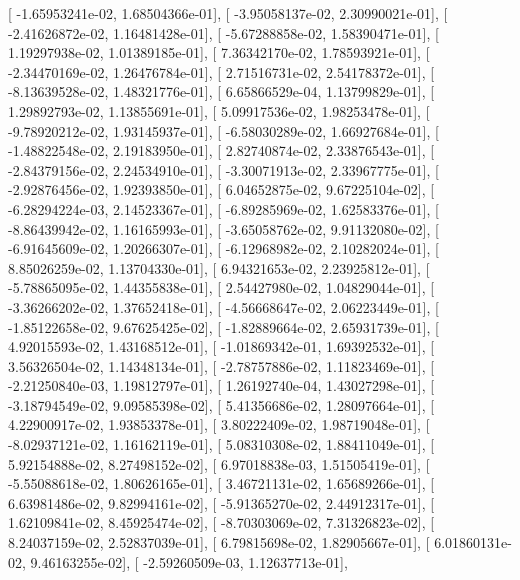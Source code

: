 \documentclass{article}
\begin{document}
       [ -1.65953241e-02,   1.68504366e-01],
       [ -3.95058137e-02,   2.30990021e-01],
       [ -2.41626872e-02,   1.16481428e-01],
       [ -5.67288858e-02,   1.58390471e-01],
       [  1.19297938e-02,   1.01389185e-01],
       [  7.36342170e-02,   1.78593921e-01],
       [ -2.34470169e-02,   1.26476784e-01],
       [  2.71516731e-02,   2.54178372e-01],
       [ -8.13639528e-02,   1.48321776e-01],
       [  6.65866529e-04,   1.13799829e-01],
       [  1.29892793e-02,   1.13855691e-01],
       [  5.09917536e-02,   1.98253478e-01],
       [ -9.78920212e-02,   1.93145937e-01],
       [ -6.58030289e-02,   1.66927684e-01],
       [ -1.48822548e-02,   2.19183950e-01],
       [  2.82740874e-02,   2.33876543e-01],
       [ -2.84379156e-02,   2.24534910e-01],
       [ -3.30071913e-02,   2.33967775e-01],
       [ -2.92876456e-02,   1.92393850e-01],
       [  6.04652875e-02,   9.67225104e-02],
       [ -6.28294224e-03,   2.14523367e-01],
       [ -6.89285969e-02,   1.62583376e-01],
       [ -8.86439942e-02,   1.16165993e-01],
       [ -3.65058762e-02,   9.91132080e-02],
       [ -6.91645609e-02,   1.20266307e-01],
       [ -6.12968982e-02,   2.10282024e-01],
       [  8.85026259e-02,   1.13704330e-01],
       [  6.94321653e-02,   2.23925812e-01],
       [ -5.78865095e-02,   1.44355838e-01],
       [  2.54427980e-02,   1.04829044e-01],
       [ -3.36266202e-02,   1.37652418e-01],
       [ -4.56668647e-02,   2.06223449e-01],
       [ -1.85122658e-02,   9.67625425e-02],
       [ -1.82889664e-02,   2.65931739e-01],
       [  4.92015593e-02,   1.43168512e-01],
       [ -1.01869342e-01,   1.69392532e-01],
       [  3.56326504e-02,   1.14348134e-01],
       [ -2.78757886e-02,   1.11823469e-01],
       [ -2.21250840e-03,   1.19812797e-01],
       [  1.26192740e-04,   1.43027298e-01],
       [ -3.18794549e-02,   9.09585398e-02],
       [  5.41356686e-02,   1.28097664e-01],
       [  4.22900917e-02,   1.93853378e-01],
       [  3.80222409e-02,   1.98719048e-01],
       [ -8.02937121e-02,   1.16162119e-01],
       [  5.08310308e-02,   1.88411049e-01],
       [  5.92154888e-02,   8.27498152e-02],
       [  6.97018838e-03,   1.51505419e-01],
       [ -5.55088618e-02,   1.80626165e-01],
       [  3.46721131e-02,   1.65689266e-01],
       [  6.63981486e-02,   9.82994161e-02],
       [ -5.91365270e-02,   2.44912317e-01],
       [  1.62109841e-02,   8.45925474e-02],
       [ -8.70303069e-02,   7.31326823e-02],
       [  8.24037159e-02,   2.52837039e-01],
       [  6.79815698e-02,   1.82905667e-01],
       [  6.01860131e-02,   9.46163255e-02],
       [ -2.59260509e-03,   1.12637713e-01],
\end{document}
